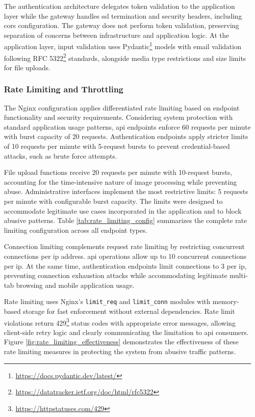 The authentication architecture delegates token validation to the application layer while the gateway handles \ac{ssl} termination and security headers, including \ac{cors} configuration. The gateway does not perform token validation, preserving separation of concerns between infrastructure and application logic. At the application layer, input validation uses Pydantic\footnote{\url{https://docs.pydantic.dev/latest/}} models with email validation following RFC 5322\footnote{\url{https://datatracker.ietf.org/doc/html/rfc5322}} standards, alongside media type restrictions and size limits for file uploads.

\subsubsection{Rate Limiting and Throttling} \label{subsubsection:rate_limiting}

The Nginx configuration applies differentiated rate limiting based on endpoint functionality and security requirements. Considering system protection with standard application usage patterns, \ac{api} endpoints enforce 60 requests per minute with burst capacity of 20 requests. Authentication endpoints apply stricter limits of 10 requests per minute with 5-request bursts to prevent credential-based attacks, such as brute force attempts.

File upload functions receive 20 requests per minute with 10-request bursts, accounting for the time-intensive nature of image processing while preventing abuse. Administrative interfaces implement the most restrictive limits: 5 requests per minute with configurable burst capacity. The limits were designed to accommodate legitimate use cases incorporated in the application and to block abusive patterns. Table \ref{tab:rate_limiting_config} summarizes the complete rate limiting configuration across all endpoint types.

Connection limiting complements request rate limiting by restricting concurrent connections per \ac{ip} address. \ac{api} operations allow up to 10 concurrent connections per \ac{ip}. At the same time, authentication endpoints limit connections to 3 per \ac{ip}, preventing connection exhaustion attacks while accommodating legitimate multi-tab browsing and mobile application usage.

Rate limiting uses Nginx's \texttt{limit\_req} and \texttt{limit\_conn} modules with memory-based storage for fast enforcement without external dependencies. Rate limit violations return 429\footnote{\url{https://httpstatuses.com/429}} status codes with appropriate error messages, allowing client-side retry logic and clearly communicating the limitation to \ac{api} consumers. Figure \ref{fig:rate_limiting_effectiveness} demonstrates the effectiveness of these rate limiting measures in protecting the system from abusive traffic patterns.

